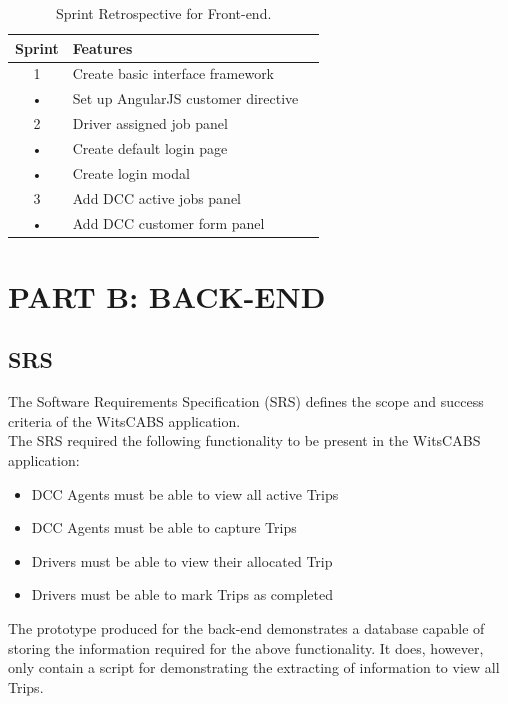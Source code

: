 \documentclass[12pt]{article}
\begin{document}
\begin{table}[htb]
    \caption{Sprint Retrospective for Front-end.\label{tab:fonts}}
    \begin{center} 
\begin{tabular}{|c|l|c|}
\hline 
Sprint & Features\\ 
\hline 
 1 & Create basic interface framework\\ 
• & Set up AngularJS customer directive\\
\hline 
 2 & Driver assigned job panel\\
• & Create default login page\\
• & Create login modal\\
\hline 
 3 & Add DCC active jobs panel \\ 
 • & Add DCC customer form panel\\
\hline
\end{tabular} 
\end{center}
\end{table}



\newpage
\section{PART B: BACK-END}
\subsection{SRS}
The Software Requirements Specification (SRS) defines the scope and success criteria of the WitsCABS application. \\

The SRS required the following functionality to be present in the WitsCABS application:
\begin{itemize}
\item DCC Agents must be able to view all active Trips
\item DCC Agents must be able to capture Trips
\item Drivers must be able to view their allocated Trip
\item Drivers must be able to mark Trips as completed
\end{itemize}

The prototype produced for the back-end demonstrates a database capable of storing the information required for the above functionality. It does, however, only contain a script for demonstrating the extracting of information to view all Trips. \\
\end{document}

